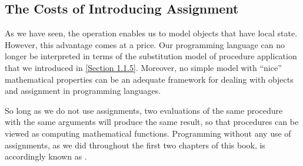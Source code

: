 \subsection{The Costs of Introducing Assignment}
\label{Section 3.1.3}

As we have seen, the  operation enables us to model objects that have local state.
However, this advantage comes at a price.
Our programming language can no longer be interpreted in terms of the substitution model of procedure application that we introduced in \cref{Section 1.1.5}.
Moreover, no simple model with “nice” mathematical properties can be an adequate framework for dealing with objects and assignment in programming languages.

So long as we do not use assignments, two evaluations of the same procedure with the same arguments will produce the same result, so that procedures can be viewed as computing mathematical functions.
Programming without any use of assignments, as we did throughout the first two chapters of this book, is accordingly known as .

